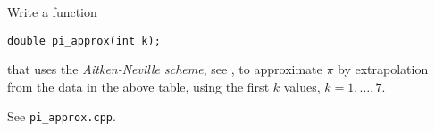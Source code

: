 \begin{problem}[Approximation of $\pi$]
Write a \Cpp{} function
\begin{center}
  \texttt{double pi\_approx(int k);}
\end{center}
that uses the \emph{Aitken-Neville scheme}, see , to
approximate $\pi$ by extrapolation from the data in the above table, using
the first $k$ values, $k=1,\ldots,7$.


\cprotEnv \begin{solution}
 See \verb|pi_approx.cpp|.
\end{solution}


%  
% 
% 
% 
% 
% 



% 
 
\end{problem}

